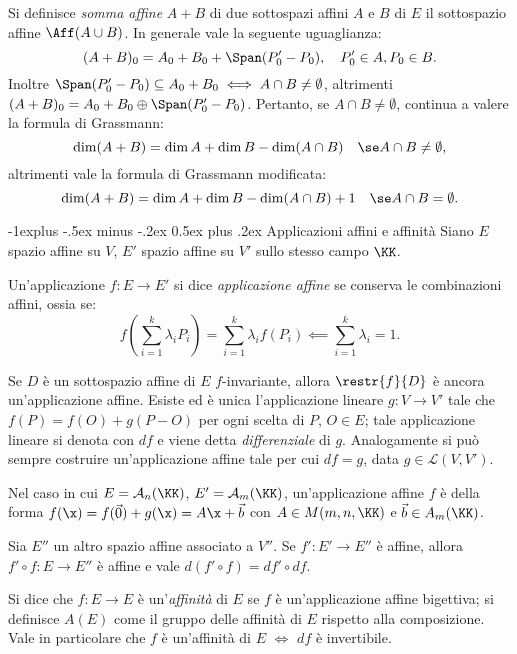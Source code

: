 \documentclass[10pt,landscape]{article}
\makeatletter
\renewcommand{\subsection}{\@startsection{subsection}{2}{0mm}%
	{-1explus -.5ex minus -.2ex}%
	{0.5ex plus .2ex}%
	{\normalfont\normalsize\bfseries}}
\makeatother
\begin{document}
\begin{multicols}{3}
		Si definisce \textit{somma affine} $A + B$ di due sottospazi affini $A$ e $B$ di $E$
		il sottospazio affine $\Aff(A \cup B)$. In generale vale la seguente
		uguaglianza:
		\[ (A + B)_0 = A_0 + B_0 + \Span(P_0' - P_0), \quad P_0' \in A, P_0 \in B. \]
		Inoltre $\Span(P_0' - P_0) \subseteq A_0 + B_0 \iff A \cap B \neq \emptyset$,
		altrimenti $(A + B)_0 = A_0 + B_0 \oplus \Span(P_0' - P_0)$. Pertanto, se $A \cap B \neq \emptyset$, continua a valere la formula di Grassmann:
		\[ \dim (A + B) = \dim A + \dim B - \dim (A \cap B) \quad \se A \cap B \neq \emptyset, \]
		altrimenti vale la formula di Grassmann modificata:
		\[ \dim (A + B) = \dim A + \dim B - \dim (A \cap B) + 1 \quad \se A \cap B = \emptyset. \]

        \subsection{Applicazioni affini e affinità}
        Siano $E$ spazio affine su $V$, $E'$ spazio affine su $V'$ sullo stesso campo $\KK$.
        
        Un'applicazione $f:E\rightarrow E'$ si dice \textit{applicazione affine} se conserva le combinazioni affini, ossia se:
        \[ f\left( \sum_{i=1}^k \lambda_i P_i \right) = \sum_{i=1}^k \lambda_i f(P_i) \impliedby \sum_{i=1}^k \lambda_i = 1. \]

        Se $D$ è un sottospazio affine di $E$ $f$-invariante,
        allora $\restr{f}{D}$ è ancora un'applicazione affine.
        Esiste ed è unica l'applicazione lineare $g : V \rightarrow V'$ tale che $f(P)=f(O)+g(P-O)$ per ogni scelta di $P$, $O \in E$; tale applicazione lineare
        si denota con $df$ e viene detta \textit{differenziale} di $g$. Analogamente si può sempre costruire un'applicazione affine tale per cui $df=g$, data
        $g \in \mathcal{L}(V, V')$.

        Nel caso in cui $E=\mathcal{A}_n(\KK)$, $E'=\mathcal{A}_m(\KK)$, un'applicazione affine $f$ è della forma $f(\x)=f(\Vec{0})+g(\x)=A \x+\Vec{b}$ con $A\in M(m,n,\KK)$ e $\Vec{b} \in A_m(\KK)$. \\ \vskip 0.05in

        Sia $E''$ un altro spazio affine associato a $V''$. Se $f':E'\rightarrow E''$ è affine, allora $f'\circ f:E\rightarrow E''$ è affine e vale $d(f' \circ f) = df' \circ df$.

        Si dice che $f : E \rightarrow E$ è un'\textit{affinità} di $E$ se $f$ è un'applicazione affine bigettiva; si definisce $A(E)$ come il gruppo
        delle affinità di $E$ rispetto alla composizione. Vale
        in particolare che $f$ è un'affinità di $E$ $\iff$ $df$ è invertibile.


\end{multicols}
\end{document}
